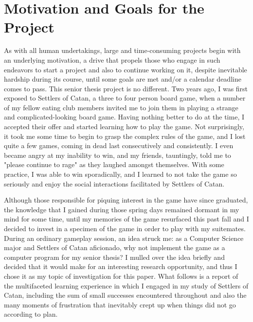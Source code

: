 \documentclass[pageno]{jpaper}
\begin{document}
\begin{doublespacing}

\hypertarget{sec:motivation_and_goals_for_the_project}{}
\section{Motivation and Goals for the Project}

As with all human undertakings, large and time-consuming projects begin with an underlying motivation, a drive that propels those who engage in such endeavors to start a project and also to continue working on it, despite inevitable hardship during its course, until some goals are met and/or a calendar deadline comes to pass. This senior thesis project is no different. Two years ago, I was first exposed to Settlers of Catan, a three to four person board game, when a number of my fellow eating club members invited me to join them in playing a strange and complicated-looking board game. Having nothing better to do at the time, I accepted their offer and started learning how to play the game. Not surprisingly, it took me some time to begin to grasp the complex rules of the game, and I lost quite a few games, coming in dead last consecutively and consistently. I even became angry at my inability to win, and my friends, tauntingly, told me to "please continue to rage" as they laughed amongst themselves. With some practice, I was able to win sporadically, and I learned to not take the game so seriously and enjoy the social interactions facilitated by Settlers of Catan. 

Although those responsible for piquing interest in the game have since graduated, the knowledge that I gained during those spring days remained dormant in my mind for some time, until my memories of the game resurfaced this past fall and I decided to invest in a specimen of the game in order to play with my suitemates. During an ordinary gameplay session, an idea struck me: as a Computer Science major and Settlers of Catan aficionado, why not implement the game as a computer program for my senior thesis? I mulled over the idea briefly and decided that it would make for an interesting research opportunity, and thus I chose it as my topic of investigation for this paper. What follows is a report of the multifaceted learning experience in which I engaged in my study of Settlers of Catan, including the sum of small successes encountered throughout and also the many moments of frustration that inevitably crept up when things did not go according to plan.


\end{doublespacing}
\end{document}
